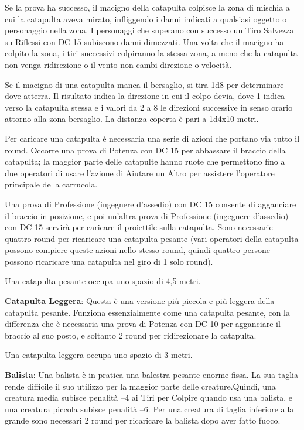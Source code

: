 \documentclass[a4paper,11pt,twoside,openany]{book}
\begin{document}
Se la prova ha successo, il macigno della catapulta colpisce la zona di mischia a cui la catapulta aveva mirato, infliggendo i danni indicati a qualsiasi oggetto o personaggio nella zona. I personaggi che superano con successo un Tiro Salvezza su Riflessi con DC 15 subiscono danni dimezzati. Una volta che il macigno ha colpito la zona, i tiri successivi colpiranno la stessa zona, a meno che la catapulta non venga ridirezione o il vento non cambi direzione o velocità.

Se il macigno di una catapulta manca il bersaglio, si tira 1d8 per determinare dove atterra. Il risultato indica la direzione in cui il colpo devia, dove 1 indica verso la catapulta stessa e i valori da 2 a 8 le direzioni successive in senso orario attorno alla zona bersaglio. La distanza coperta è pari a 1d4x10 metri.

Per caricare una catapulta è necessaria una serie di azioni che portano via tutto il round. Occorre una prova di Potenza con DC 15 per abbassare il braccio della catapulta; la maggior parte delle catapulte hanno ruote che permettono fino a due operatori di usare l'azione di Aiutare un Altro per assistere l'operatore principale della carrucola.

Una prova di Professione (ingegnere d'assedio) con DC 15 consente di agganciare il braccio in posizione, e poi un'altra prova di Professione (ingegnere d'assedio) con DC 15 servirà per caricare il proiettile sulla catapulta. Sono necessarie quattro round per ricaricare una catapulta pesante (vari operatori della catapulta possono compiere queste azioni nello stesso round, quindi quattro persone possono ricaricare una catapulta nel giro di 1 solo round).

Una catapulta pesante occupa uno spazio di 4,5 metri.

\textbf{Catapulta Leggera}: Questa è una versione più piccola e più leggera della catapulta pesante. Funziona essenzialmente come una catapulta pesante, con la differenza che è necessaria una prova di Potenza con DC 10 per agganciare il braccio al suo posto, e soltanto 2 round per ridirezionare la catapulta.

Una catapulta leggera occupa uno spazio di 3 metri.

\textbf{Balista}: Una balista è in pratica una balestra pesante enorme fissa. La sua taglia rende difficile il suo utilizzo per la maggior parte delle creature.Quindi, una creatura media subisce penalità --4 ai Tiri per Colpire quando usa una balista, e una creatura piccola subisce penalità --6. Per una creatura di taglia inferiore alla grande sono necessari 2 round per ricaricare la balista dopo aver fatto fuoco.
\end{document}
